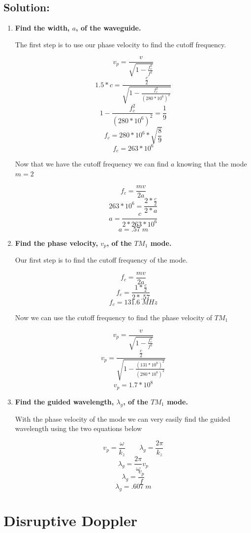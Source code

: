 \documentclass{article}
\begin{document}
\subsection{Solution:}
\begin{enumerate}[label=(\alph*)]
    \item \textbf{Find the width, $a$, of the waveguide.}

    The first step is to use our phase velocity to find the cutoff frequency.

    $$v_{p} = \frac{v}{\sqrt{1-\frac{f_{c}^{2}}{f^{2}}}}$$
    $$1.5*c = \frac{\frac{c}{2}}{\sqrt{1-\frac{f_{c}^{2}}{(280*10^{6})^{2}}}}$$
    $$1-\frac{f_{c}^{2}}{(280*10^{6})^{2}} = \frac{1}{9}$$
    $$f_{c} = 280*10^{6}*\sqrt{\frac{8}{9}}$$
    $$f_{c} = 263*10^{6}$$

    Now that we have the cutoff frequency we can find $a$ knowing that the mode $m = 2$

    $$f_{c} = \frac{mv}{2a}$$
    $$263*10^{6} = \frac{2*\frac{c}{2}}{2*a}$$
    $$a = \frac{c}{2*263*10^{6}}$$
    $$\boxed{a = .57\; m}$$
    
    \item \textbf{Find the phase velocity, $v_{p}$, of the $TM_{1}$ mode.}

    Our first step is to find the cutoff frequency of the mode.

    $$f_{c} = \frac{mv}{2a}$$
    $$f_{c} = \frac{1*\frac{c}{2}}{2*.57}$$
    $$f_{c} = 131.6\; MHz$$

    Now we can use the cutoff frequency to find the phase velocity of $TM_{1}$

    $$v_{p} = \frac{v}{\sqrt{1-\frac{f_{c}^{2}}{f^{2}}}}$$
    $$v_{p} = \frac{\frac{c}{2}}{\sqrt{1-\frac{(131*10^{6})^{2}}{(280*10^{6})^{2}}}}$$
    $$\boxed{v_{p} = 1.7*10^{8}}$$
    
    \item \textbf{Find the guided wavelength, $\lambda_{g}$, of the $TM_{1}$ mode.}

    With the phase velocity of the mode we can very easily find the guided wavelength using the two equations below

    $$v_{p} = \frac{\omega}{k_{z}} \qquad \lambda_{g} = \frac{2\pi}{k_{z}}$$
    $$\lambda_{g} = \frac{2\pi}{\omega}v_{p}$$
    $$\lambda_{g} = \frac{v_{p}}{f}$$
    $$\boxed{\lambda_{g} = .607\; m}$$
\end{enumerate}

\newpage

\section{Disruptive Doppler}
\end{document}
